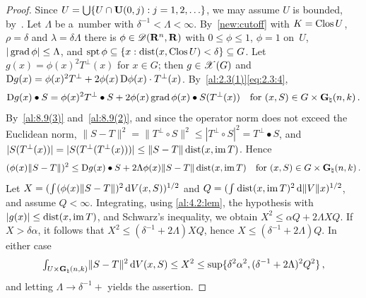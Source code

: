 \begin{proof}
    Since $U = {{\textstyle \bigcup}} \{ U \cap \mathbf{U}(0,j) : j = 1, 2, \ldots \}$, we may assume $U$ is bounded,
    by~\cite[2.4.7]{Federer1969}. Let $\Lambda$ be a~number with $\delta^{-1} < \Lambda < \infty$.
    By~\ref{new:cutoff} with $K = \mathop{\mathrm{Clos}}U$, $\rho = \delta$ and $\lambda = \delta \Lambda$ there is
    $\phi \in \mathscr{D}(\mathbf{R}^{n},\mathbf{R})$ with $0 \le \phi \le 1$, $\phi = 1$ on~$U$, $|\operatorname{grad} \phi| \le
    \Lambda$, and $\operatorname{spt} \phi \subseteq \{ x : \operatorname{dist}(x, \mathop{\mathrm{Clos}}U) < \delta \} \subseteq G$. Let $g(x)
    = \phi(x)^2 T^\perp(x)$ for $x \in G$; then $g \in \mathscr{X}(G)$ and $\mathrm{D} g(x) = \phi(x)^2 T^\perp + 2
    \phi(x) \, \mathrm{D} \phi(x) \cdot T^\perp(x)$. By~\ref{al:2.3(1)}\eqref{eq:2.3:4},
    \begin{displaymath}
        \mathrm{D} g(x) \bullet S = \phi(x)^2 T^\perp \bullet S + 2 \phi(x) \operatorname{grad} \phi(x) \bullet
        S(T^\perp(x)) \quad \text{for $(x,S) \in G \times \mathbf{G}_{\natural}(n,k)$} \,.
    \end{displaymath}
    By~\ref{al:8.9(3)} and~\ref{al:8.9(2)}, and since the operator norm does not exceed the
    Euclidean norm, $\|S - T\|^2 = \|T^\perp \circ S\|^2 \le |T^\perp \circ S|^2 = T^\perp \bullet S$,
    and $|S(T^\perp(x))| = |S(T^\perp(T^\perp(x)))| \le \|S - T\| \operatorname{dist}(x, \operatorname{im} T)$. Hence
    \begin{displaymath}
        (\phi(x) \|S - T\|)^2 \le \mathrm{D} g(x) \bullet S + 2 \Lambda \phi(x) \|S - T\| \operatorname{dist}(x, \operatorname{im} T)
        \quad \text{for $(x,S) \in G \times \mathbf{G}_{\natural}(n,k)$} \,.
    \end{displaymath}
    Let $X = ({\textstyle\int_{}^{}} (\phi(x) \|S - T\|)^2 \,\mathrm{d} V(x,S))^{1/2}$ and $Q = ({\textstyle\int_{}^{}}
    \operatorname{dist}(x, \operatorname{im} T)^2 \,\mathrm{d} \|V\| x)^{1/2}$, and assume $Q < \infty$. Integrating, using
    \ref{al:4.2:lem}, the hypothesis with $|g(x)| \le \operatorname{dist}(x, \operatorname{im} T)$, and Schwarz's inequality, we
    obtain $X^2 \le \alpha Q + 2 \Lambda X Q$. If $X > \delta \alpha$, it follows that $X^2 \le
    (\delta^{-1} + 2 \Lambda) X Q$, hence $X \le (\delta^{-1} + 2 \Lambda) Q$. In either case
    \begin{displaymath}
        {\textstyle\int_{U \times \mathbf{G}_{\natural}(n,k)}^{}} \|S - T\|^2 \,\mathrm{d} V(x,S) \le X^2 \le \sup \{ \delta^2
        \alpha^2, (\delta^{-1} + 2 \Lambda)^2 Q^2 \} \,,
    \end{displaymath}
    and letting $\Lambda \to \delta^{-1}+$ yields the assertion.
\end{proof}

